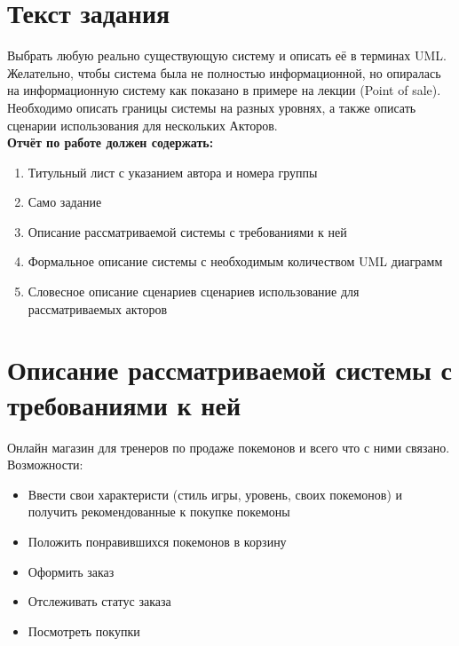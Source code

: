 \documentclass[12pt,onecolumn]{article}
\begin{document}
\section{Текст задания}
Выбрать любую реально существующую систему и описать её в терминах UML. Желательно, чтобы система была не полностью информационной, но опиралась на информационную систему как показано в примере на лекции (Point of sale). Необходимо описать границы системы на разных уровнях, а также описать сценарии использования для нескольких Акторов.\\
\textbf{Отчёт по работе должен содержать:}
\begin{enumerate}
  \item Титульный лист с указанием автора и номера группы
  \item Само задание
  \item Описание рассматриваемой системы с требованиями к ней
  \item Формальное описание системы с необходимым количеством UML диаграмм
  \item Словесное описание сценариев сценариев использование для рассматриваемых акторов
\end{enumerate}
\section{Описание рассматриваемой системы с требованиями к ней}
Онлайн магазин для тренеров по продаже покемонов и всего что с ними связано.\\
Возможности:
\begin{itemize}
  \item Ввести свои характеристи (стиль игры, уровень, своих покемонов) и получить рекомендованные к покупке покемоны
  \item Положить понравившихся покемонов в корзину
  \item Оформить заказ
  \item Отслеживать статус заказа
  \item Посмотреть покупки
\end{itemize}
\end{document}
